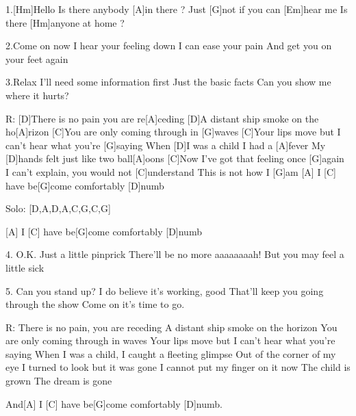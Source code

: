 
1.[Hm]Hello
Is there anybody [A]in there ?
Just [G]not if you can [Em]hear me
Is there [Hm]anyone at home ?

2.Come on now
I hear your feeling down
I can ease your pain
And get you on your feet again

3.Relax
I'll need some information first
Just the basic facts
Can you show me where it hurts?

R: [D]There is no pain you are re[A]ceding
[D]A distant ship smoke on the ho[A]rizon
[C]You are only coming through in [G]waves
[C]Your lips move but I can't hear what you're [G]saying
When [D]I was a child I had a [A]fever
My [D]hands felt just like two ball[A]oons
[C]Now I've got that feeling once [G]again
I can't explain, you would not [C]understand
This is not how I [G]am
[A] I [C] have be[G]come comfortably [D]numb

Solo:
[D,A,D,A,C,G,C,G]

[A] I [C] have be[G]come comfortably [D]numb

4. O.K.
Just a little pinprick
There'll be no more aaaaaaaah!
But you may feel a little sick

5. Can you stand up?
I do believe it's working, good
That'll keep you going through the show
Come on it's time to go.

R: There is no pain, you are receding
A distant ship smoke on the horizon
You are only coming through in waves
Your lips move but I can't hear what you're saying
When I was a child, I caught a fleeting glimpse
Out of the corner of my eye
I turned to look but it was gone
I cannot put my finger on it now
The child is grown
The dream is gone

And[A] I [C] have be[G]come comfortably [D]numb.